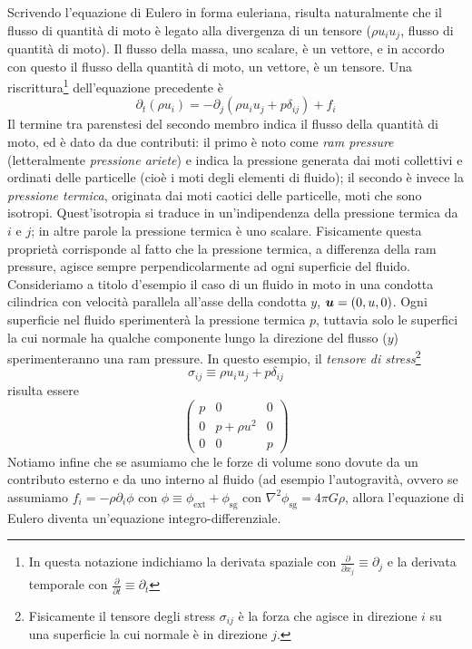 Scrivendo l'equazione di Eulero in forma euleriana, risulta naturalmente che il flusso di quantità di moto è legato alla divergenza di un tensore ($\rho u_i u_j$, flusso di quantità di moto). Il flusso della massa, uno scalare, è un vettore, e in accordo con questo il flusso della quantità di moto, un vettore, è un tensore. Una riscrittura\footnote{In questa notazione indichiamo la derivata spaziale con $\frac{\partial}{\partial x_j} \equiv \partial_j  $ e la derivata temporale con $\frac{\partial}{\partial t} \equiv \partial_t  $} dell'equazione precedente è 
\begin{equation}
{\partial_t} (\rho u_i) =  - {\partial_j} (\rho u_i u_j +  p \delta_{ij} ) + f_i
\end{equation}
Il termine tra parenstesi del secondo membro indica il flusso della quantità di moto, ed è dato da due contributi: il primo è noto come \textit{ram pressure} (letteralmente \textit{pressione ariete}) e indica la pressione generata dai moti collettivi e ordinati delle particelle (cioè i moti degli elementi di fluido); il secondo è invece la \textit{pressione termica}, originata dai moti caotici delle particelle, moti che sono isotropi. Quest'isotropia si traduce in un'indipendenza della pressione termica da $i$ e $j$; in altre parole la pressione termica è uno scalare. Fisicamente questa proprietà corrisponde al fatto che la pressione termica, a differenza della ram pressure, agisce sempre perpendicolarmente ad ogni superficie del fluido. Consideriamo a titolo d'esempio il caso di un fluido in moto in una condotta cilindrica con velocità parallela all'asse della condotta $y$, $\V{u} = (0, u, 0)$. Ogni superficie nel fluido sperimenterà la pressione termica $p$, tuttavia solo le superfici la cui normale ha qualche componente lungo la direzione del flusso ($y$) sperimenteranno una ram pressure. In questo esempio, il \textit{tensore di stress}\footnote{Fisicamente il tensore degli stress $\sigma_{ij}$ è la forza che agisce in direzione $i$ su una superficie la cui normale è in direzione $j$.}
\begin{equation}
\sigma_{ij} \equiv \rho u_i u_j +  p \delta_{ij} \label{eq:Stress0}
\end{equation}
risulta essere
\[
\begin{pmatrix}
p & 0 & 0 \\
0 & p+\rho u^2 & 0 \\
0 & 0 & p
\end{pmatrix}
\]
Notiamo infine che se asumiamo che le forze di volume sono dovute da un contributo esterno e da uno interno al fluido (ad esempio l'autogravità, ovvero se assumiamo
$f_i=-\rho\partial_i \phi$ con $\phi \equiv \phi_{\mathrm{ext}} + \phi_{\mathrm{sg}}$ con $\nabla^2 \phi_{\mathrm{sg}}=4 \pi G \rho$, allora l'equazione di Eulero diventa un'equazione integro-differenziale.

